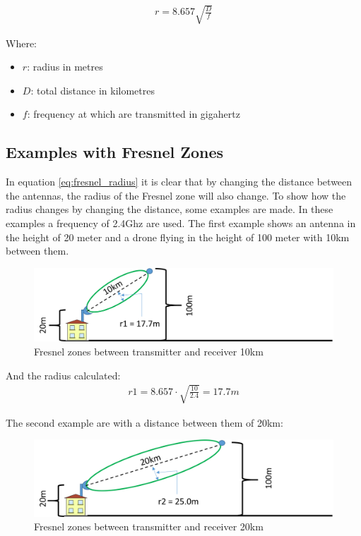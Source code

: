 \begin{align}
r= 8.657 \sqrt{\frac{D}{f}} \label{eq:fresnel_radius}
\end{align}

Where:
\begin{itemize}[label=]
    \item $r$: radius in metres
    \item $D$: total distance in kilometres
    \item $f$: frequency at which are transmitted in gigahertz
\end{itemize}

\subsection{Examples with Fresnel Zones}
In equation \ref{eq:fresnel_radius} it is clear that by changing the distance between the antennas, the radius of the Fresnel zone will also change. To show how the radius changes by changing the distance, some examples are made. In these examples a frequency of 2.4Ghz are used. The first example shows an antenna in the height of 20 meter and a drone flying in the height of 100 meter with 10km between them.

\begin{figure}[H]
	\centering
	\includegraphics[scale=0.50]{figures/fresnel_10km.png}
	\caption{Fresnel zones between transmitter and receiver 10km}
	\label{fig:fresnel_zones_10km}
\end{figure}  

And the radius calculated:
\begin{align*}
r1 = 8.657\cdot \sqrt{\frac{10}{2.4}} = 17.7m
\end{align*}

The second example are with a distance between them of 20km:

\begin{figure}[H]
	\centering
	\includegraphics[scale=0.50]{figures/fresnel_20km.png}
	\caption{Fresnel zones between transmitter and receiver 20km}
	\label{fig:fresnel_zones_20km}
\end{figure}  


